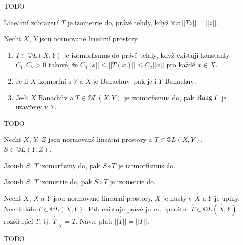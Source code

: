 \documentclass[12pt]{article}					%
\begin{document}
\begin{definice}
	TODO	
\end{definice}

\begin{poznamka}
	Lineární zobrazení $T$ je izometrie do, právě tehdy, když $\forall z: ||Tz|| = ||z||$.
\end{poznamka}

\begin{tvrzeni}
	Nechť $X$, $Y$ jsou normované lineární prostory.

	\begin{enumerate}
		\item $T \in ©L(X, Y)$ je izomorfismus do právě tehdy, když existují konstanty $C_1, C_2 > 0$ takové, že $C_1 ||x|| ≤ ||T(x)|| ≤ C_2 ||x||$ pro každé $x \in X$.
		\item Je-li $X$ izomorfní s $Y$ a $X$ je Banachův, pak je i $Y$ Banachův.
		\item Je-li $X$ Banachův a $T \in ©L(X, Y)$ je izomorfismus do, pak $\operatorname{Rang} T$ je uzavřený v $Y$.
	\end{enumerate}

	\begin{dukazin}
		TODO
	\end{dukazin}
\end{tvrzeni}

\begin{poznamka}[Fakt]
	Nechť $X$, $Y$, $Z$ jsou normované lineární prostory a $T \in ©L(X, Y)$, $S \in ©L(Y, Z)$.

	Jsou-li $S$, $T$ izomorfismy do, pak $S \circ T$ je izomorfismus do.
	
	Jsou-li $S$, $T$ izometrie do, pak $S \circ T$ je izometrie do.
\end{poznamka}

\begin{veta}
	Nechť $X$, $\hat{X}$ a $Y$ jsou normované lineární prostory, $X$ je hustý v $\hat{X}$ a $Y$ je úplný. Nechť dále $T \in ©L(X, Y)$. Pak existuje právě jeden operátor $\hat{T} \in ©L(\hat{X}, Y)$ rozšiřující $T$, tj. $\hat{T}|_X = T$. Navíc platí $||\hat{T}|| = ||T||$.

	\begin{dukazin}
		TODO
	\end{dukazin}
\end{veta}

\end{document}
